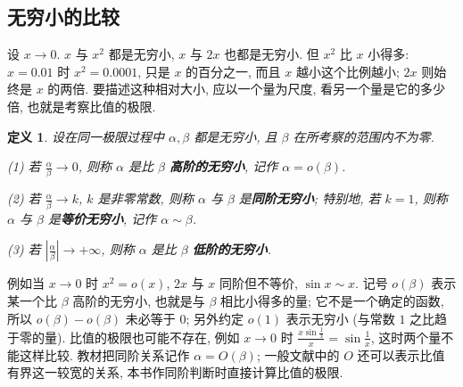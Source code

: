 \documentclass[UTF8,openany]{ctexbook}
\theoremstyle{chinesetextbook}
\newtheorem{definition}{定义}[section]
\begin{document}
\subsection{无穷小的比较}
设 $x\to0$. $x$ 与 $x^2$ 都是无穷小, $x$ 与 $2x$ 也都是无穷小. 但 $x^2$ 比 $x$ 小得多: $x=0.01$ 时 $x^2=0.0001$, 只是 $x$ 的百分之一, 而且 $x$ 越小这个比例越小; $2x$ 则始终是 $x$ 的两倍. 要描述这种相对大小, 应以一个量为尺度, 看另一个量是它的多少倍, 也就是考察比值的极限.
\begin{definition}
设在同一极限过程中 $\alpha,\beta$ 都是无穷小, 且 $\beta$ 在所考察的范围内不为零.

\textup{(1)} 若 $\displaystyle\frac\alpha\beta\to0$, 则称 $\alpha$ 是比 $\beta$ \textbf{高阶的无穷小}, 记作 $\alpha=o(\beta)$.

\textup{(2)} 若 $\displaystyle\frac\alpha\beta\to k$, $k$ 是非零常数, 则称 $\alpha$ 与 $\beta$ 是\textbf{同阶无穷小}; 特别地, 若 $k=1$, 则称 $\alpha$ 与 $\beta$ 是\textbf{等价无穷小}, 记作 $\alpha\sim\beta$.

\textup{(3)} 若 $\displaystyle\left|\frac\alpha\beta\right|\to+\infty$, 则称 $\alpha$ 是比 $\beta$ \textbf{低阶的无穷小}.
\end{definition}
例如当 $x\to0$ 时 $x^2=o(x)$, $2x$ 与 $x$ 同阶但不等价, $\sin x\sim x$. 记号 $o(\beta)$ 表示某一个比 $\beta$ 高阶的无穷小, 也就是与 $\beta$ 相比小得多的量; 它不是一个确定的函数, 所以 $o(\beta)-o(\beta)$ 未必等于 $0$; 另外约定 $o(1)$ 表示无穷小 (与常数 $1$ 之比趋于零的量). 比值的极限也可能不存在, 例如 $x\to0$ 时 $\displaystyle\frac{x\sin\frac1x}x=\sin\frac1x$, 这时两个量不能这样比较. 教材把同阶关系记作 $\alpha=O(\beta)$; 一般文献中的 $O$ 还可以表示比值有界这一较宽的关系, 本书作同阶判断时直接计算比值的极限.
\end{document}

